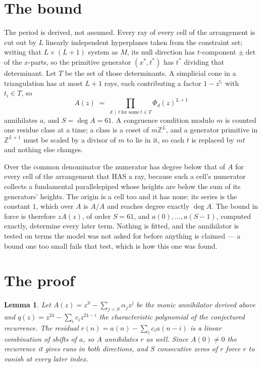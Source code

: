 \documentclass[11pt,a4paper]{article}
\theoremstyle{plain}
\newtheorem{lemma}[theorem]{Lemma}
\theoremstyle{definition}
\begin{document}
\section{The bound}

The period is derived, not assumed. Every ray of every cell of the arrangement is cut out by
$L$ linearly independent hyperplanes taken from the constraint set; writing that $L\times(L+1)$
system as $M$, its null direction has $t$-component $\pm\det$ of the $x$-parts, so the
primitive generator $(x^*,t^*)$ has $t^*$ dividing that determinant. Let $T$ be the set of
those determinants. A simplicial cone in a triangulation has at most $L+1$ rays, each
contributing a factor $1-z^{t_i}$ with $t_i\in T$, so
\[
A(z)\;=\;\prod_{d\,\mid\,t\ \text{for some}\ t\in T}\Phi_d(z)^{L+1}
\]
annihilates $a$, and $S=\deg A=61$. A congruence condition modulo $m$ is counted one residue
class at a time; a class is a coset of $m\mathbb{Z}^L$, and a generator primitive in
$\mathbb{Z}^{L+1}$ must be scaled by a divisor of $m$ to lie in it, so each $t$ is replaced
by $mt$ and nothing else changes.

Over the common denominator the numerator has degree below that of $A$ for every cell of the
arrangement that HAS a ray, because such a cell's numerator collects a fundamental
parallelepiped whose heights are below the sum of its generators' heights. The origin is a cell
too and it has none: its series is the constant $1$, which over $A$ is $A/A$ and reaches degree
exactly $\deg A$. The bound in force is therefore $zA(z)$, of order $S=61$, and
$a(0),\dots,a(S-1)$, computed exactly, determine every later term. Nothing is fitted, and the
annihilator is tested on terms the model was not asked for before anything is claimed --- a
bound one too small fails that test, which is how this one was found.

\section{The proof}

\begin{lemma}\label{lem:crit}
Let $A(z)=z^S-\sum_{j<S}\alpha_jz^{j}$ be the monic annihilator derived above and
$q(z)=z^{24}-\sum_ic_iz^{24-i}$ the characteristic polynomial of the conjectured
recurrence. The residual $r(n)=a(n)-\sum_ic_ia(n-i)$ is a linear combination of shifts of $a$,
so $A$ annihilates $r$ as well. Since $A(0)\ne0$ the recurrence it gives runs in both
directions, and $S$ consecutive zeros of $r$ force $r$ to vanish at every later index.
\end{lemma}
\end{document}
